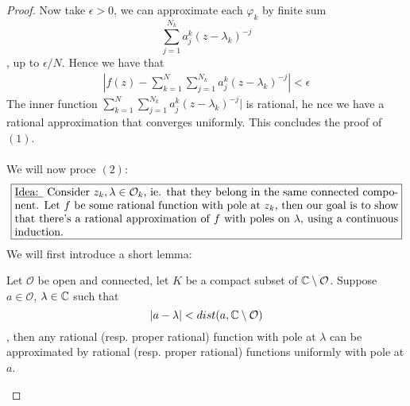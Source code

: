\begin{proof}
Now take $\epsilon > 0$, we can approximate each $\varphi_k$ by finite sum
\[\sum_{j = 1}^{N_k} a^k_j (z - \lambda_k)^{-j}\]
, up to $\epsilon/N$. Hence we have that
\begin{align*}
    |f(z) - \sum_{k = 1}^N \sum_{j = 1}^{N_k} a_j^k (z - \lambda_k)^{-j}| < \epsilon
\end{align*}
The inner function $\sum_{k = 1}^N \sum_{j = 1}^{N_k} a_j^k (z - \lambda_k)^{-j}|$ is rational, he nce we have a rational approximation that converges uniformly. This concludes the proof of $(1)$.\\\\
We will now proce $(2)$:
    \[\noindent\fbox{%
    \parbox{\textwidth}{%
    \underline{Idea: } Consider $z_k, \lambda \in \mathcal{O}_k$, ie. that they belong in the same connected component. Let $f$ be some rational function with pole at $z_k$, then our goal is to show that there's a rational approximation of $f$ with poles on $\lambda$, using a continuous induction.
    }%
}\]
We will first introduce a short lemma:
\begin{lemma}
    Let $\mathcal{O}$ be open and connected, let $K$ be a compact subset of $\mathbb{C} \setminus \mathcal{O}$. Suppose $a \in \mathcal{O}$, $\lambda \in \mathbb{C}$ such that
    \[|a - \lambda| < dist(a, \mathbb{C} \setminus \mathcal{O})\]
    , then any rational (resp. proper rational) function with pole at $\lambda$ can be approximated by rational (resp. proper rational) functions uniformly with pole at $a$.
\end{lemma}


\end{proof}

